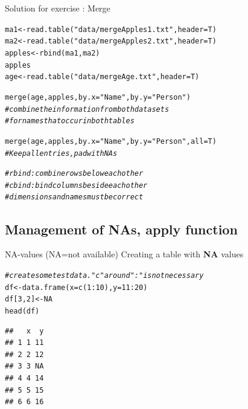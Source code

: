 \documentclass[xcolor=table,           xcolor=dvipsnames]{beamer}\usepackage[]{graphicx}\usepackage[]{color}
\makeatletter
\newcommand{\hlnum}[1]{\textcolor[rgb]{0,0,0}{#1}}
\newcommand{\hlstr}[1]{\textcolor[rgb]{0.545,0.137,0.137}{#1}}
\newcommand{\hlcom}[1]{\textcolor[rgb]{0,0.392,0}{\textit{#1}}}
\newcommand{\hlopt}[1]{\textcolor[rgb]{0,0,0}{#1}}
\newcommand{\hlstd}[1]{\textcolor[rgb]{0,0,0}{#1}}
\newcommand{\hlkwb}[1]{\textcolor[rgb]{0,0,0}{#1}}
\newcommand{\hlkwc}[1]{\textcolor[rgb]{1,0,1}{#1}}
\newcommand{\hlkwd}[1]{\textcolor[rgb]{0,0,1}{#1}}
\newenvironment{kframe}{%
 \def\at@end@of@kframe{}%
 \ifinner\ifhmode%
  \def\at@end@of@kframe{\end{minipage}}%
  \begin{minipage}{\columnwidth}%
 \fi\fi%
 \def\FrameCommand##1{\hskip\@totalleftmargin \hskip-\fboxsep
 \colorbox{shadecolor}{##1}\hskip-\fboxsep
     \hskip-\linewidth \hskip-\@totalleftmargin \hskip\columnwidth}%
 \MakeFramed {\advance\hsize-\width
   \@totalleftmargin\z@ \linewidth\hsize
   \@setminipage}}%
 {\par\unskip\endMakeFramed%
 \at@end@of@kframe}
\newenvironment{knitrout}{}{} %
\newcounter{exercisecount}
\makeatother
\begin{document}
\begin{frame}[fragile]{Solution for exercise : Merge}
\begin{knitrout}
\color{fgcolor}\begin{kframe}
\begin{alltt}
\hlstd{ma1} \hlkwb{<-} \hlkwd{read.table}\hlstd{(}\hlstr{"data/mergeApples1.txt"}\hlstd{,} \hlkwc{header}\hlstd{=T)}
\hlstd{ma2} \hlkwb{<-} \hlkwd{read.table}\hlstd{(}\hlstr{"data/mergeApples2.txt"}\hlstd{,} \hlkwc{header}\hlstd{=T)}
\hlstd{apples} \hlkwb{<-} \hlkwd{rbind}\hlstd{(ma1, ma2)}
\hlstd{apples}
\hlstd{age} \hlkwb{<-} \hlkwd{read.table}\hlstd{(}\hlstr{"data/mergeAge.txt"}\hlstd{,} \hlkwc{header}\hlstd{=T)}

\hlkwd{merge}\hlstd{(age, apples,} \hlkwc{by.x}\hlstd{=}\hlstr{"Name"}\hlstd{,} \hlkwc{by.y}\hlstd{=}\hlstr{"Person"}\hlstd{)}
\hlcom{# combine the information from both datasets}
\hlcom{# for names that occur in both tables}

\hlkwd{merge}\hlstd{(age, apples,} \hlkwc{by.x}\hlstd{=}\hlstr{"Name"}\hlstd{,} \hlkwc{by.y}\hlstd{=}\hlstr{"Person"}\hlstd{,} \hlkwc{all}\hlstd{=T)}
\hlcom{# Keep all entries, pad with NAs}

\hlcom{# rbind: combine rows below each other}
\hlcom{# cbind: bind columns beside each other}
\hlcom{# dimensions and names must be correct}
\end{alltt}
\end{kframe}
\end{knitrout}
\end{frame}

\subsection{Management of NAs, apply function}

\begin{frame}[fragile]{NA-values (NA=not available)}
Creating a table with \textbf{NA} values
\begin{knitrout}
\color{fgcolor}\begin{kframe}
\begin{alltt}
\hlcom{# create some test data. "c" around ":" is not necessary}
\hlstd{df} \hlkwb{<-} \hlkwd{data.frame}\hlstd{(}\hlkwc{x}\hlstd{=} \hlkwd{c}\hlstd{(}\hlnum{1}\hlopt{:}\hlnum{10}\hlstd{),} \hlkwc{y}\hlstd{=}\hlnum{11}\hlopt{:}\hlnum{20} \hlstd{)}
\hlstd{df[}\hlnum{3}\hlstd{,}\hlnum{2}\hlstd{]} \hlkwb{<-} \hlnum{NA}
\hlkwd{head}\hlstd{(df)}
\end{alltt}
\begin{verbatim}
##   x  y
## 1 1 11
## 2 2 12
## 3 3 NA
## 4 4 14
## 5 5 15
## 6 6 16
\end{verbatim}
\end{kframe}
\end{knitrout}
\end{frame}
\end{document}

